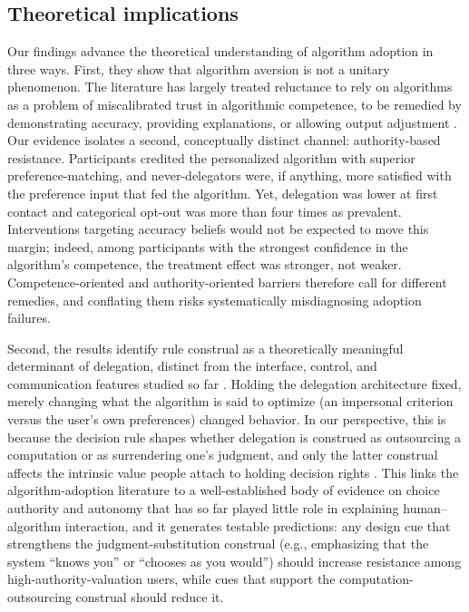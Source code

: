\documentclass[a4paper, 12pt, fleqn]{article}
\theoremstyle{definition}
\begin{document}
\subsection{Theoretical implications}
Our findings advance the theoretical understanding of algorithm adoption in three ways.
First, they show that algorithm aversion is not a unitary phenomenon. The literature has largely treated reluctance to rely on algorithms as a problem of miscalibrated trust in algorithmic competence, to be remedied by demonstrating accuracy, providing explanations, or allowing output adjustment \citep{Dietvorst2018,Yeomans2019,Leichtmann2023}. Our evidence isolates a second, conceptually distinct channel: authority-based resistance. Participants credited the personalized algorithm with superior preference-matching, and never-delegators were, if anything, more satisfied with the preference input that fed the algorithm. Yet, delegation was lower at first contact and categorical opt-out was more than four times as prevalent. Interventions targeting accuracy beliefs would not be expected to move this margin; indeed, among participants with the strongest confidence in the algorithm's competence, the treatment effect was stronger, not weaker. Competence-oriented and authority-oriented barriers therefore call for different remedies, and conflating them risks systematically misdiagnosing adoption failures.

Second, the results identify rule construal as a theoretically meaningful determinant of delegation, distinct from the interface, control, and communication features studied so far \citep{Dietvorst2018,Hildebrand2021,Fink2024}. Holding the delegation architecture fixed, merely changing what the algorithm is said to optimize (an impersonal criterion versus the user's own preferences) changed behavior. In our perspective, this is because the decision rule shapes whether delegation is construed as outsourcing a computation or as surrendering one's judgment, and only the latter construal affects the intrinsic value people attach to holding decision rights \citep{Bartling2014,Owens2014,FreyBenzStutzer2004}. This links the algorithm-adoption literature to a well-established body of evidence on choice authority and autonomy \citep{Brehm1966,DeciRyan2000,Leotti2010} that has so far played little role in explaining human--algorithm interaction, and it generates testable predictions: any design cue that strengthens the judgment-substitution construal (e.g., emphasizing that the system ``knows you'' or ``chooses as you would'') should increase resistance among high-authority-valuation users, while cues that support the computation-outsourcing construal should reduce it.
\end{document}
